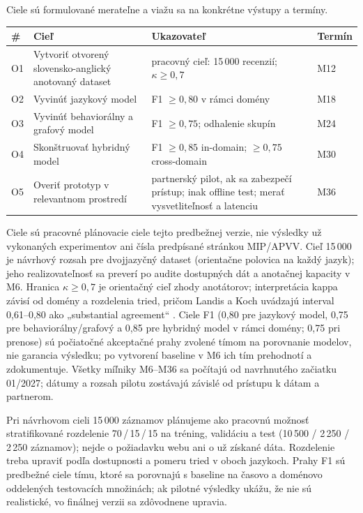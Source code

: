 \documentclass[11pt,a4paper]{article}
\begin{document}
Ciele sú formulované merateľne a viažu sa na konkrétne výstupy a termíny.

\begin{table}[h!]
\centering
\small
\begin{tabularx}{\textwidth}{@{}p{0.8cm} X p{4.2cm} p{1.5cm}@{}}
\toprule
\# & Cieľ & Ukazovateľ & Termín \\
\midrule
O1 & Vytvoriť otvorený slovensko-anglický anotovaný dataset & pracovný cieľ: 15\,000 recenzií; $\kappa \geq 0{,}7$ & M12 \\
O2 & Vyvinúť jazykový model & F1 $\geq 0{,}80$ v rámci domény & M18 \\
O3 & Vyvinúť behaviorálny a grafový model & F1 $\geq 0{,}75$; odhalenie skupín & M24 \\
O4 & Skonštruovať hybridný model & F1 $\geq 0{,}85$ in-domain; $\geq 0{,}75$ cross-domain & M30 \\
O5 & Overiť prototyp v relevantnom prostredí & partnerský pilot, ak sa zabezpečí prístup; inak offline test; merať vysvetliteľnosť a latenciu & M36 \\
\bottomrule
\end{tabularx}
\end{table}

Ciele sú pracovné plánovacie ciele tejto predbežnej verzie, nie výsledky už vykonaných experimentov ani čísla predpísané stránkou MIP/APVV. Cieľ 15\,000 je návrhový rozsah pre dvojjazyčný dataset (orientačne polovica na každý jazyk); jeho realizovateľnosť sa preverí po audite dostupných dát a anotačnej kapacity v M6. Hranica $\kappa \geq 0{,}7$ je orientačný cieľ zhody anotátorov; interpretácia kappa závisí od domény a rozdelenia tried, pričom Landis a Koch uvádzajú interval 0,61–0,80 ako „substantial agreement“ \cite{landis1977}. Ciele F1 (0,80 pre jazykový model, 0,75 pre behaviorálny/grafový a 0,85 pre hybridný model v rámci domény; 0,75 pri prenose) sú počiatočné akceptačné prahy zvolené tímom na porovnanie modelov, nie garancia výsledku; po vytvorení baseline v M6 ich tím prehodnotí a zdokumentuje. Všetky míľniky M6–M36 sa počítajú od navrhnutého začiatku 01/2027; dátumy a rozsah pilotu zostávajú závislé od prístupu k dátam a partnerom.

Pri návrhovom cieli 15\,000 záznamov plánujeme ako pracovnú možnosť stratifikované rozdelenie 70\,/\,15\,/\,15 na tréning, validáciu a test (10\,500 / 2\,250 / 2\,250 záznamov); nejde o požiadavku webu ani o už získané dáta. Rozdelenie treba upraviť podľa dostupnosti a pomeru tried v oboch jazykoch. Prahy F1 sú predbežné ciele tímu, ktoré sa porovnajú s baseline na časovo a doménovo oddelených testovacích množinách; ak pilotné výsledky ukážu, že nie sú realistické, vo finálnej verzii sa zdôvodnene upravia.
\end{document}
